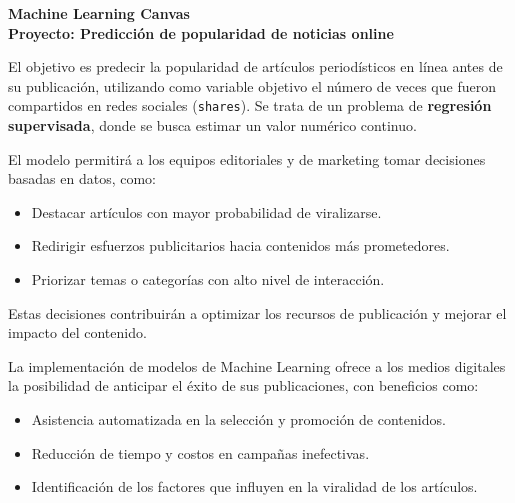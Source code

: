 \documentclass[12pt]{article}
\begin{document}
\begin{center}
    \LARGE \textbf{Machine Learning Canvas}\\[6pt]
    \large \textbf{Proyecto: Predicción de popularidad de noticias online}
\end{center}

\vspace{0.5cm}

\begin{tcolorbox}[colback=CanvasBlue!20,colframe=CanvasHeader,title=\textbf{Prediction Task}]
El objetivo es predecir la popularidad de artículos periodísticos en línea antes de su publicación, utilizando como variable objetivo el número de veces que fueron compartidos en redes sociales (\texttt{shares}). 
Se trata de un problema de \textbf{regresión supervisada}, donde se busca estimar un valor numérico continuo.
\end{tcolorbox}

\begin{tcolorbox}[colback=CanvasBlue!20,colframe=CanvasHeader,title=\textbf{Decisions}]
El modelo permitirá a los equipos editoriales y de marketing tomar decisiones basadas en datos, como:
\begin{itemize}
    \item Destacar artículos con mayor probabilidad de viralizarse.
    \item Redirigir esfuerzos publicitarios hacia contenidos más prometedores.
    \item Priorizar temas o categorías con alto nivel de interacción.
\end{itemize}
Estas decisiones contribuirán a optimizar los recursos de publicación y mejorar el impacto del contenido.
\end{tcolorbox}

\begin{tcolorbox}[colback=CanvasBlue!20,colframe=CanvasHeader,title=\textbf{Value Proposition}]
La implementación de modelos de Machine Learning ofrece a los medios digitales la posibilidad de anticipar el éxito de sus publicaciones, con beneficios como:
\begin{itemize}
    \item Asistencia automatizada en la selección y promoción de contenidos.
    \item Reducción de tiempo y costos en campañas inefectivas.
    \item Identificación de los factores que influyen en la viralidad de los artículos.
\end{itemize}
\end{tcolorbox}
\end{document}

